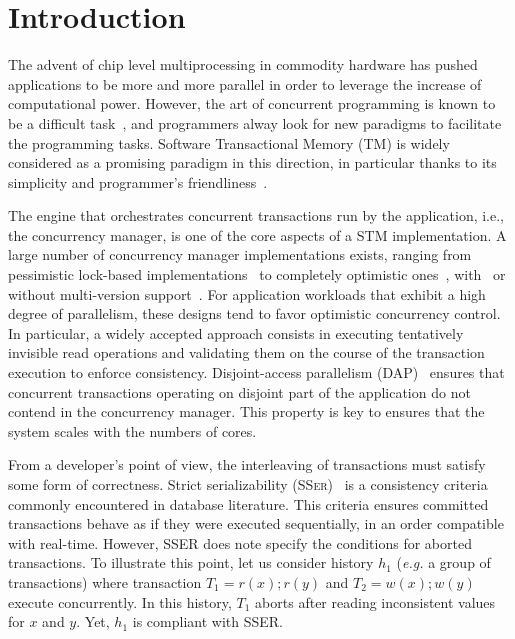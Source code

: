 \section{Introduction}

The advent of chip level multiprocessing in commodity hardware has pushed applications to be more and more parallel in order to leverage the increase of computational power.
However, the art of concurrent programming is known to be a difficult task~\cite{Lee:2006:PT:1137232.1137289}, and programmers alway look for new paradigms to facilitate the programming tasks.
Software Transactional Memory (TM) is widely considered as a promising paradigm in this direction, in particular thanks to its simplicity and programmer's friendliness~\cite{Dragojevic:2011:WSM:1924421.1924440}.

The engine that orchestrates concurrent transactions run by the application, i.e., the concurrency manager, is one of the core aspects of a STM implementation.
A large number of concurrency manager implementations exists, ranging from pessimistic lock-based implementations~\cite{harris2005revocable,afek2012pessimistic} to completely optimistic ones~\cite{hassan2014optimistic}, with~\cite{perelman2011smv} or without multi-version support~\cite{attiya2012single}.
For application workloads that exhibit a high degree of parallelism, these designs tend to favor optimistic concurrency control.
In particular, a widely accepted approach consists in executing tentatively invisible read operations and validating them on the course of the transaction execution to enforce consistency.
Disjoint-access parallelism (DAP)~\cite{ellen2012universal} ensures that concurrent transactions operating on disjoint part of the application do not contend in the concurrency manager.
This property is key to ensures that the system scales with the numbers of cores.

From a developer's point of view, the interleaving of transactions must satisfy some form of correctness.
Strict serializability (\textsc{SSer})~\cite{herlihy1990linearizability} is a consistency criteria commonly encountered in database literature.
This criteria ensures committed transactions behave as if they were executed sequentially, in an order compatible with real-time.
However, SSER does note specify the conditions for aborted transactions.
To illustrate this point, let us consider history $h_1$ (\emph{e.g.} a group of transactions) where transaction $T_1=r(x);r(y)$ and $T_2=w(x);w(y)$ execute concurrently.
In this history, $T_1$ aborts after reading inconsistent values for $x$ and $y$.
Yet, $h_1$ is compliant with SSER.


